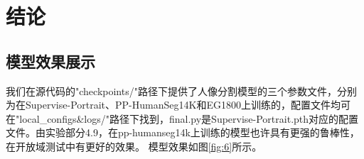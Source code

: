 \documentclass[11pt]{article}
\begin{document}
\section{结论}
\subsection{模型效果展示}
我们在源代码的"checkpoints/"路径下提供了人像分割模型的三个参数文件，分别为在Supervise-Portrait、PP-HumanSeg14K和EG1800上训练的，配置文件均可在"local_configs\&logs/"路径下找到，final.py是Supervise-Portrait.pth对应的配置文件。由实验部分4.9，在pp-humanseg14k上训练的模型也许具有更强的鲁棒性，在开放域测试中有更好的效果。
模型效果如图\ref{fig:6}所示。
\begin{figure}[!h]
  \centering
\end{figure}
\end{document}

